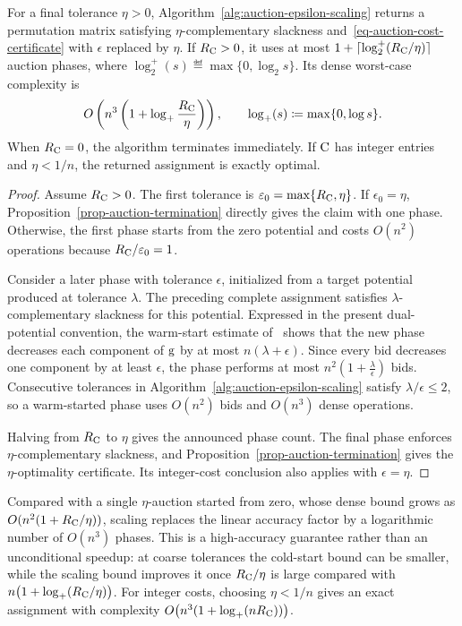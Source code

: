\begin{prop}\label{prop-auction-epsilon-scaling}
	For a final tolerance $\eta>0$, Algorithm~\ref{alg:auction-epsilon-scaling} returns a permutation matrix satisfying $\eta$-complementary slackness and~\eqref{eq-auction-cost-certificate} with $\epsilon$ replaced by $\eta$. If $R_{\mathrm{C}}>0$, it uses at most
	$1+\lceil\log_2^+(R_{\mathrm{C}}/\eta)\rceil$ auction phases, where
	$\log_2^+(s)\eqdef\max\{0,\log_2 s\}$. Its dense worst-case complexity is
	\[
		O\left(n^3\left(1+\log_+\frac{R_{\mathrm{C}}}{\eta}\right)\right),
		\qquad
		\log_+(s)\coloneqq\max\{0,\log s\}.
	\]
	When $R_{\mathrm{C}}=0$, the algorithm terminates immediately. If $\mathrm{C}$ has integer entries and $\eta<1/n$, the returned assignment is exactly optimal.
\end{prop}
\begin{proof}
	Assume $R_{\mathrm{C}}>0$. The first tolerance is $\varepsilon_0=\max\{R_{\mathrm{C}},\eta\}$. If $\epsilon_0=\eta$, Proposition~\ref{prop-auction-termination} directly gives the claim with one phase. Otherwise, the first phase starts from the zero potential and costs $O(n^2)$ operations because $R_{\mathrm{C}}/\varepsilon_0=1$.

	Consider a later phase with tolerance $\epsilon$, initialized from a target potential produced at tolerance $\lambda$. The preceding complete assignment satisfies $\lambda$-complementary slackness for this potential. Expressed in the present dual-potential convention, the warm-start estimate of~\cite[Lem.~25]{merigot2020optimaltransportalgorithms} shows that the new phase decreases each component of $\mathrm{g}$ by at most $n(\lambda+\epsilon)$. Since every bid decreases one component by at least $\epsilon$, the phase performs at most
	\(n^2\left(1+\frac{\lambda}{\epsilon}\right)\)
	bids. Consecutive tolerances in Algorithm~\ref{alg:auction-epsilon-scaling} satisfy $\lambda/\epsilon\leq2$, so a warm-started phase uses $O(n^2)$ bids and $O(n^3)$ dense operations.

	Halving from $R_{\mathrm{C}}$ to $\eta$ gives the announced phase count. The final phase enforces $\eta$-complementary slackness, and Proposition~\ref{prop-auction-termination} gives the $\eta$-optimality certificate. Its integer-cost conclusion also applies with $\epsilon=\eta$.
\end{proof}

Compared with a single $\eta$-auction started from zero, whose dense bound grows as $O(n^2(1+R_{\mathrm{C}}/\eta))$, scaling replaces the linear accuracy factor by a logarithmic number of $O(n^3)$ phases. This is a high-accuracy guarantee rather than an unconditional speedup: at coarse tolerances the cold-start bound can be smaller, while the scaling bound improves it once $R_{\mathrm{C}}/\eta$ is large compared with $n\bigl(1+\log_+(R_{\mathrm{C}}/\eta)\bigr)$. For integer costs, choosing $\eta<1/n$ gives an exact assignment with complexity $O\bigl(n^3(1+\log_+(nR_{\mathrm{C}}))\bigr)$.

